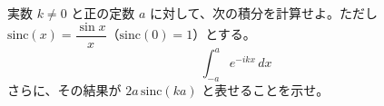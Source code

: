 
実数 $k \neq 0$ と正の定数 $a$ に対して、次の積分を計算せよ。ただし $\mathrm{sinc}(x) = \dfrac{\sin x}{x}$（$\mathrm{sinc}(0)=1$）とする。
\[
\int_{-a}^{a} e^{-ikx}\,dx
\]
さらに、その結果が $2a\,\mathrm{sinc}(ka)$ と表せることを示せ。
